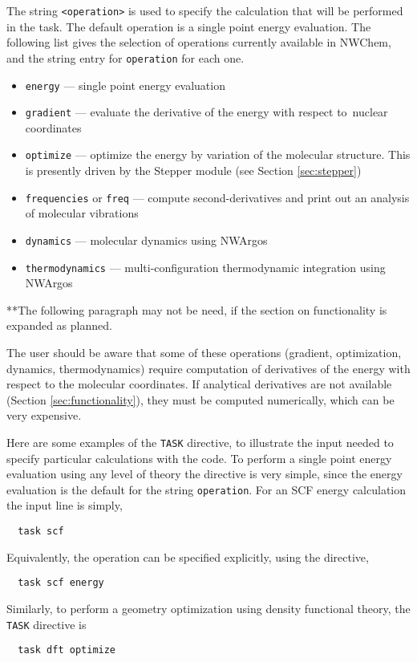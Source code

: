 The string \verb+<operation>+ is used to specify the calculation that will
be performed in the task.  The default operation is a single point energy
evaluation.  The following list gives the selection of operations currently
available in NWChem, and the string entry for \verb+operation+ for each one.
\begin{itemize}
\item \verb+energy+ --- single point energy evaluation
\item \verb+gradient+ --- evaluate the derivative of the energy with respect to\
   nuclear coordinates
\item \verb+optimize+ --- optimize the energy by variation of the molecular
   structure.  This is presently driven by the Stepper module
   (see Section \ref{sec:stepper})
\item \verb+frequencies+ or \verb+freq+ --- compute second-derivatives 
and print out an analysis of molecular vibrations
\item \verb+dynamics+ --- molecular dynamics using NWArgos
\item \verb+thermodynamics+ --- multi-configuration thermodynamic integration
    using NWArgos
\end{itemize}

\Large
**The following paragraph may not be need, if the section on functionality
is expanded as planned.
\normalsize

The user should be aware that some of these operations (gradient,
optimization, dynamics, thermodynamics) require computation of
derivatives of the energy with respect to the molecular coordinates.
If analytical derivatives are not available (Section
\ref{sec:functionality}), they must be computed numerically, which can
be very expensive.

Here are some examples of the \verb+TASK+ directive, to illustrate the
input needed to specify particular calculations with the code.  To
perform a single point energy evaluation using any level of theory the
directive is very simple, since the energy evaluation is the default
for the string \verb+operation+.  For an SCF energy calculation the
input line is simply,
\begin{verbatim}
  task scf
\end{verbatim}
Equivalently, the operation can be specified explicitly, using the
directive,
\begin{verbatim}
  task scf energy
\end{verbatim}

Similarly, to perform a geometry optimization using density functional
theory, the \verb+TASK+ directive is
\begin{verbatim}
  task dft optimize
\end{verbatim}

